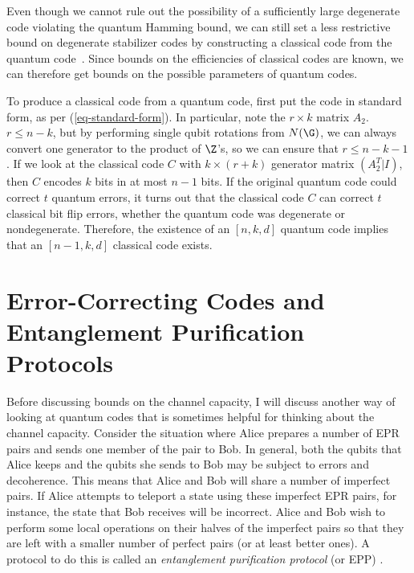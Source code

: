 Even though we cannot rule out the possibility of a sufficiently large
degenerate code violating the quantum Hamming bound, we can still set
a less restrictive bound on degenerate stabilizer codes by constructing
a classical code from the quantum code~\cite{cleve-classical}.  Since bounds
on the efficiencies of classical codes are known, we can therefore get
bounds on the possible parameters of quantum codes.

To produce a classical code from a quantum code, first put the code in
standard form, as per (\ref{eq-standard-form}).  In particular, note the
$r \times k$ matrix $A_2$.  $r \leq n-k$, but by performing single qubit
rotations from $N(\G)$, we can always convert one generator to the product of
$\Z$'s, so we can ensure that $r \leq n-k-1$.  If we look at the classical code
$C$ with $k \times (r+k)$ generator matrix $(A_2^T | I)$, then $C$ encodes
$k$ bits in at most $n-1$ bits.  If the original quantum code could correct
$t$ quantum errors, it turns out that the classical code $C$ can correct $t$
classical bit flip errors, whether the quantum code was degenerate or
nondegenerate.  Therefore, the existence of an $[n, k, d]$ quantum code
implies that an $[n-1, k, d]$ classical code exists.

\section{Error-Correcting Codes and Entanglement Purification Protocols}

Before discussing bounds on the channel capacity, I will discuss another
way of looking at quantum codes that is sometimes helpful for thinking
about the channel capacity.  Consider the situation where Alice prepares a
number of EPR pairs and sends one member of the pair to Bob.  In general,
both the qubits that Alice keeps and the qubits she sends to Bob may be
subject to errors and decoherence.  This means that Alice and Bob will
share a number of imperfect pairs.  If Alice attempts to teleport a state
using these imperfect EPR pairs, for instance, the state that Bob receives
will be incorrect.  Alice and Bob wish to perform some local operations on
their halves of the imperfect pairs so that they are left with a smaller
number of perfect pairs (or at least better ones).  A protocol to do this is
called an {\em entanglement purification protocol} (or EPP)
\cite{bennett-tome,bennett-EPP}.

